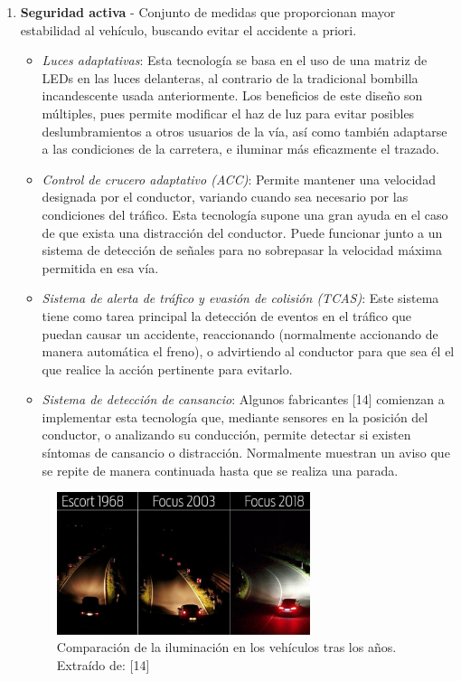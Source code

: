 \begin{enumerate}
    \item \textbf{Seguridad activa} - Conjunto de medidas que proporcionan mayor estabilidad al vehículo, buscando evitar el accidente a priori.
    \begin{itemize}
        \item \textit{Luces adaptativas}: Esta tecnología se basa en el uso de una matriz de LEDs en las luces delanteras, al contrario de la tradicional bombilla incandescente usada anteriormente. Los beneficios de este diseño son múltiples, pues permite modificar el haz de luz para evitar posibles deslumbramientos a otros usuarios de la vía, así como también adaptarse a las condiciones de la carretera, e iluminar más eficazmente el trazado.
     
        \item \textit{Control de crucero adaptativo (ACC)}: Permite mantener una velocidad designada por el conductor, variando cuando sea necesario por las condiciones del tráfico. Esta tecnología supone una gran ayuda en el caso de que exista una distracción del conductor. Puede funcionar junto a un sistema de detección de señales para no sobrepasar la velocidad máxima permitida en esa vía.
    
        \item \textit{Sistema de alerta de tráfico y evasión de colisión (TCAS)}: Este sistema tiene como tarea principal la detección de eventos en el tráfico que puedan causar un accidente, reaccionando (normalmente accionando de manera automática el freno), o advirtiendo al conductor para que sea él el que realice la acción pertinente para evitarlo.

        \item \textit{Sistema de detección de cansancio}: Algunos fabricantes [14] comienzan a implementar esta tecnología que, mediante sensores en la posición del conductor, o analizando su conducción, permite detectar si existen síntomas de cansancio o distracción. Normalmente muestran un aviso que se repite de manera continuada hasta que se realiza una parada. 
\end{itemize}

\begin{figure}[h]
    \centering
    \includegraphics[width=0.7\textwidth]{imagenes/adaptive_lights.png}
    \caption{Comparación de la iluminación en los vehículos tras los años. Extraído de: [14]}
\end{figure}



\end{enumerate}
